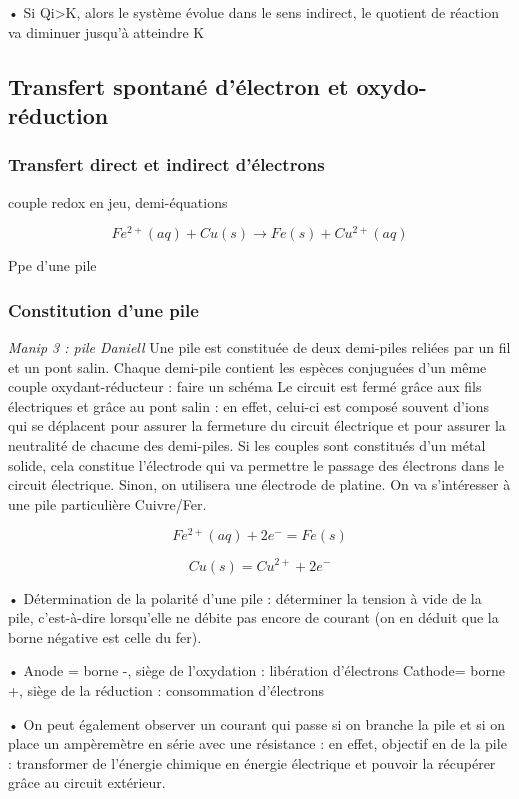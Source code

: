 \documentclass{article}%
\begin{document}
• Si Qi>K, alors le système évolue dans le sens indirect, le quotient de réaction va diminuer
jusqu’à atteindre K

\subsection{Transfert spontané d'électron et oxydo-réduction}
\subsubsection{Transfert direct et indirect d'électrons}
couple redox en jeu, demi-équations

\[Fe^{2+}(aq) + Cu(s) \rightarrow Fe(s) +Cu^{2+}(aq)\]

Ppe d'une pile

\subsubsection{Constitution d'une pile}
\textit{Manip 3 : pile Daniell}
Une pile est constituée de deux demi-piles reliées par un fil et un pont salin. Chaque demi-pile
contient les espèces conjuguées d’un même couple oxydant-réducteur : faire un schéma
Le circuit est fermé grâce aux fils électriques et grâce au pont salin : en effet, celui-ci est composé
souvent d’ions qui se déplacent pour assurer la fermeture du circuit électrique et pour assurer la
neutralité de chacune des demi-piles.
Si les couples sont constitués d’un métal solide, cela constitue l’électrode qui va permettre le
passage des électrons dans le circuit électrique. Sinon, on utilisera une électrode de platine.
On va s’intéresser à une pile particulière Cuivre/Fer.

\[Fe^{2+}(aq) + 2e^{-} = Fe(s)\]

\[Cu(s) = Cu^{2+} + 2e^{-}\]

• Détermination de la polarité d’une pile : déterminer la tension à vide de la pile, c’est-à-dire
lorsqu’elle ne débite pas encore de courant (on en déduit que la borne négative est celle du
fer).

• Anode = borne -, siège de l’oxydation : libération d’électrons
Cathode= borne +, siège de la réduction : consommation d’électrons

• On peut également observer un courant qui passe si on branche la pile et si on place un
ampèremètre en série avec une résistance : en effet, objectif en de la pile : transformer de
l’énergie chimique en énergie électrique et pouvoir la récupérer grâce au circuit extérieur.
\end{document}
